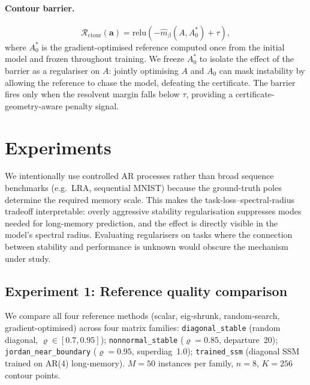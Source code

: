 \documentclass{article}
\theoremstyle{definition}
\begin{document}
\paragraph{Contour barrier.}
\[
  \mathcal{R}_{\mathrm{ctour}}(\mathbf{a}) = \mathrm{relu}\!\left(-\hat{m}_\beta(A, A_0^*) + \tau\right),
\]
where $A_0^*$ is the gradient-optimised reference computed once from
the initial model and frozen throughout training.  We freeze $A_0^*$ to
isolate the effect of the barrier as a regulariser on $A$: jointly
optimising $A$ and $A_0$ can mask instability by allowing the reference
to chase the model, defeating the certificate.  The barrier fires only
when the resolvent margin falls below $\tau$, providing a
certificate-geometry-aware penalty signal.

\section{Experiments}
\label{sec:experiments}

We intentionally use controlled AR processes rather than broad sequence
benchmarks (e.g.\ LRA, sequential MNIST) because the ground-truth poles
determine the required memory scale.  This makes the task-loss--spectral-radius
tradeoff interpretable: overly aggressive stability regularisation suppresses
modes needed for long-memory prediction, and the effect is directly visible
in the model's spectral radius.  Evaluating regularisers on tasks where
the connection between stability and performance is unknown would obscure
the mechanism under study.

\subsection{Experiment 1: Reference quality comparison}

We compare all four reference methods (scalar, eig-shrunk, random-search,
gradient-optimised) across four matrix families:
\texttt{diagonal\_stable} (random diagonal, $\varrho \in [0.7, 0.95]$);
\texttt{nonnormal\_stable} ($\varrho = 0.85$, departure~20);
\texttt{jordan\_near\_boundary} ($\varrho = 0.95$, superdiag~1.0);
\texttt{trained\_ssm} (diagonal SSM trained on AR(4) long-memory).
$M = 50$ instances per family, $n = 8$, $K = 256$ contour points.
\end{document}

